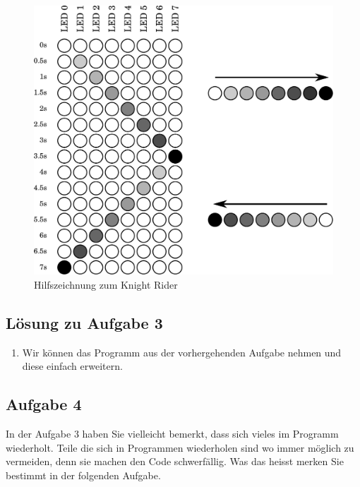 \vfill
\begin{figure}[h!]
	\centering
	\includegraphics[scale=0.6]{../pictures/knightrider.pdf}
	\caption{Hilfszeichnung zum Knight Rider}
\end{figure}
\vfill

\ifteacher
\newpage
\subsection{Lösung zu Aufgabe 3}
\begin{enumerate}[label=(\alph*)]
	\item Wir können das Programm aus der vorhergehenden Aufgabe nehmen
	und diese einfach erweitern.
	
\end{enumerate}
\fi

\newpage
\subsection{Aufgabe 4}
In der Aufgabe 3 haben Sie vielleicht bemerkt, dass sich vieles im 
Programm wiederholt. Teile die sich in Programmen wiederholen sind
wo immer möglich zu vermeiden, denn sie machen den Code schwerfällig.
Was das heisst merken Sie bestimmt in der folgenden Aufgabe.

